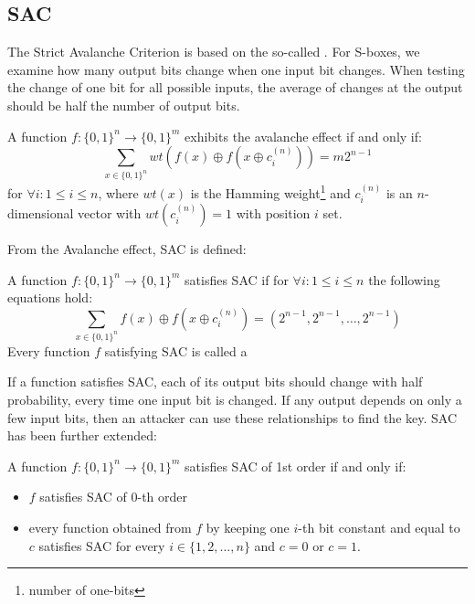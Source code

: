 \subsection{SAC}\label{critSAC}
The Strict Avalanche Criterion \cite{yokohama} is based on the so-called .
For S-boxes, we examine how many output bits change when one input bit changes. When testing
the change of one bit for all possible inputs, the average of changes at the output should be half the number of output
bits.

\begin{definition} A function $f: \{0,1\}^n \rightarrow \{0,1\}^m$
exhibits the avalanche effect if and only if:
  \begin{equation}
    \sum\limits_{x \in \{0,1\}^n} wt(f(x) \oplus f(x \oplus c^{(n)}_i)) = m 2^{n-1}
  \end{equation}
for $\forall i: 1 \leq i \leq n$, where $wt(x)$ is the Hamming weight\footnote{number of one-bits}
and $c^{(n)}_i$ is an $n$-dimensional vector with $wt(c^{(n)}_i) = 1$ with position $i$ set.
\end{definition}

From the Avalanche effect, SAC is defined:

\begin{definition} A function $f: \{0,1\}^n \rightarrow \{0,1\}^m$ satisfies SAC if
for $\forall i: 1 \leq i \leq n$ the following equations hold:
  \begin{equation}
    \sum\limits_{x \in \{0,1\}^n} f(x) \oplus f(x \oplus c^{(n)}_i) = (2^{n-1}, 2^{n-1}, \dots, 2^{n-1})
  \end{equation}
  Every function $f$ satisfying SAC is called a 
\end{definition}

If a function satisfies SAC, each of its output bits should change with half probability,
every time one input bit is changed. If any output depends on only a few input
bits, then an attacker can use these relationships to find the key.
SAC has been further extended:

\begin{definition} A function $f: \{0,1\}^n \rightarrow \{0,1\}^m$ satisfies SAC of 1st order
if and only if:
  \begin{itemize}
    \item $f$ satisfies SAC of 0-th order
    \item every function obtained from $f$ by keeping one $i$-th bit constant and equal to $c$
      satisfies SAC for every $i \in \{1,2,\dots,n\}$ and $c = 0$ or $c = 1$.
  \end{itemize}
\end{definition}

